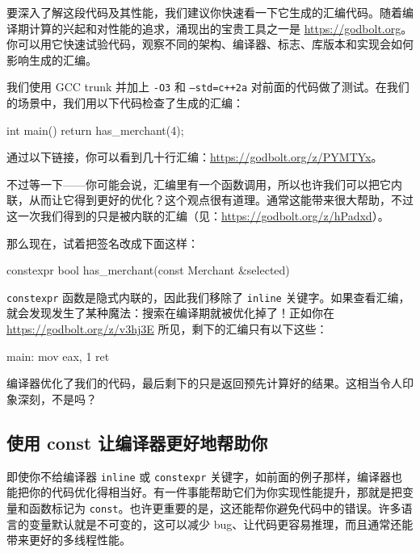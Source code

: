 \label{idx:501}
要深入了解这段代码及其性能，我们建议你快速看一下它生成的汇编代码。随着编译期计算的兴起和对性能的追求，涌现出的宝贵工具之一是 \href{https://godbolt.org}{https://godbolt.org}。你可以用它快速试验代码，观察不同的架构、编译器、标志、库版本和实现会如何影响生成的汇编。

我们使用 GCC trunk 并加上 \texttt{-O3} 和 \texttt{--std=\allowbreak{}c+\allowbreak{}+\allowbreak{}2a} 对前面的代码做了测试。在我们的场景中，我们用以下代码检查了生成的汇编：

\begin{codebox}[text]
int main() { return has_merchant({4}); }
\end{codebox}

通过以下链接，你可以看到几十行汇编：\href{https://godbolt.org/z/PYMTYx}{https://godbolt.org/z/PYMTYx}。

不过等一下——你可能会说，汇编里有一个函数调用，所以也许我们可以把它内联，从而让它得到更好的优化？这个观点很有道理。通常这能带来很大帮助，不过这一次我们得到的只是被内联的汇编（见：\href{https://godbolt.org/z/hPadxd}{https://godbolt.org/z/hPadxd}）。

那么现在，试着把签名改成下面这样：

\begin{codebox}[cpp]
constexpr bool has_merchant(const Merchant &selected)
\end{codebox}

\texttt{constexpr} 函数是隐式内联的，因此我们移除了 \texttt{inline} 关键字。如果查看汇编，就会发现发生了某种魔法：搜索在编译期就被优化掉了！正如你在 \href{https://godbolt.org/z/v3hj3E}{https://godbolt.org/z/v3hj3E} 所见，剩下的汇编只有以下这些：

\begin{codebox}[text]
main:
        mov     eax, 1
        ret
\end{codebox}

编译器优化了我们的代码，最后剩下的只是返回预先计算好的结果。这相当令人印象深刻，不是吗？

\subsection{使用 const 让编译器更好地帮助你}

\label{idx:502}
\label{idx:503}
即使你不给编译器 \texttt{inline} 或 \texttt{constexpr} 关键字，如前面的例子那样，编译器也能把你的代码优化得相当好。有一件事能帮助它们为你实现性能提升，那就是把变量和函数标记为 \texttt{const}。也许更重要的是，这还能帮你避免代码中的错误。许多语言的变量默认就是不可变的，这可以减少 bug、让代码更容易推理，而且通常还能带来更好的多线程性能。

